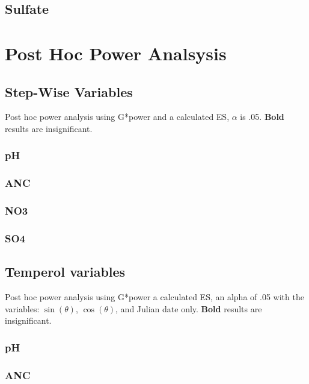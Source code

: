 	\section{Sulfate}
		


\chapter{Post Hoc Power Analsysis}\pagebreak
	\section{Step-Wise Variables}\label{sec:SWPHPA}
Post hoc power analysis using G*power and a calculated ES, $\alpha$ is .05. \textbf{Bold} results are insignificant.
		\subsection{pH}
			\pagebreak%

		\subsection{ANC}
			\pagebreak

		\subsection{NO3}
			\pagebreak

		\subsection{SO4}
			\pagebreak


	\section{Temperol variables}\label{sec:TVPHPA}
Post hoc power analysis using G*power a calculated ES, an alpha of .05 with the variables: $\sin(\theta)$, $\cos(\theta)$, and Julian date only.   \textbf{Bold} results are insignificant.
		\subsection{pH}
			\pagebreak%

		\subsection{ANC}
			\pagebreak

